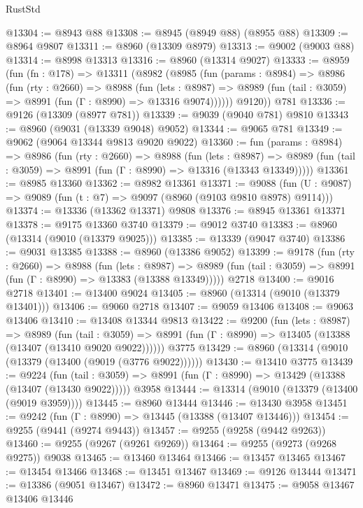 \begin{lexlean}{RustStd}
\begin{coremodule}
@13304 := @8943 @88
@13308 := @8945 (@8949 @88) (@8955 @88)
@13309 := @8964 @9807
@13311 := @8960 (@13309 @8979)
@13313 := @9002 (@9003 @88)
@13314 := @8998 @13313
@13316 := @8960 (@13314 @9027)
@13333 := @8959
    (fun (fn : @178) =>
    @13311
      (@8982
        (@8985
          (fun (params : @8984) =>
          @8986
            (fun (rty : @2660) =>
            @8988
              (fun (lets : @8987) =>
              @8989 (fun (tail : @3059) => @8991 (fun (Γ : @8990) => @13316 @9074))))))
        @9120))
    @781
@13336 := @9126 (@13309 (@8977 @781))
@13339 := @9039 (@9040 @781) @9810
@13343 := @8960 (@9031 (@13339 @9048) @9052)
@13344 := @9065 @781
@13349 := @9062 (@9064 @13344 @9813 @9020 @9022)
@13360 := fun (params : @8984) =>
  @8986
    (fun (rty : @2660) =>
    @8988
      (fun (lets : @8987) =>
      @8989 (fun (tail : @3059) => @8991 (fun (Γ : @8990) => @13316 (@13343 @13349)))))
@13361 := @8985 @13360
@13362 := @8982 @13361
@13371 := @9088 (fun (U : @9087) => @9089 (fun (t : @7) => @9097 (@8960 (@9103 @9810 @8978) @9114)))
@13374 := @13336 (@13362 @13371) @9808
@13376 := @8945 @13361 @13371
@13378 := @9175 @13360 @3740
@13379 := @9012 @3740
@13383 := @8960 (@13314 (@9010 (@13379 @9025)))
@13385 := @13339 (@9047 @3740)
@13386 := @9031 @13385
@13388 := @8960 (@13386 @9052)
@13399 := @9178
    (fun (rty : @2660) =>
    @8988
      (fun (lets : @8987) =>
      @8989 (fun (tail : @3059) => @8991 (fun (Γ : @8990) => @13383 (@13388 @13349)))))
    @2718
@13400 := @9016 @2718
@13401 := @13400 @9024
@13405 := @8960 (@13314 (@9010 (@13379 @13401)))
@13406 := @9060 @2718
@13407 := @9059 @13406
@13408 := @9063 @13406
@13410 := @13408 @13344 @9813
@13422 := @9200
    (fun (lets : @8987) =>
    @8989
      (fun (tail : @3059) =>
      @8991 (fun (Γ : @8990) => @13405 (@13388 (@13407 (@13410 @9020 @9022))))))
    @3775
@13429 := @8960 (@13314 (@9010 (@13379 (@13400 (@9019 (@3776 @9022))))))
@13430 := @13410 @3775
@13439 := @9224
    (fun (tail : @3059) => @8991 (fun (Γ : @8990) => @13429 (@13388 (@13407 (@13430 @9022)))))
    @3958
@13444 := @13314 (@9010 (@13379 (@13400 (@9019 @3959))))
@13445 := @8960 @13444
@13446 := @13430 @3958
@13451 := @9242 (fun (Γ : @8990) => @13445 (@13388 (@13407 @13446)))
@13454 := @9255 (@9441 (@9274 @9443))
@13457 := @9255 (@9258 (@9442 @9263))
@13460 := @9255 (@9267 (@9261 @9269))
@13464 := @9255 (@9273 (@9268 @9275)) @9038
@13465 := @13460 @13464
@13466 := @13457 @13465
@13467 := @13454 @13466
@13468 := @13451 @13467
@13469 := @9126 @13444
@13471 := @13386 (@9051 @13467)
@13472 := @8960 @13471
@13475 := @9058 @13467 @13406 @13446

\end{coremodule}
\end{lexlean}
